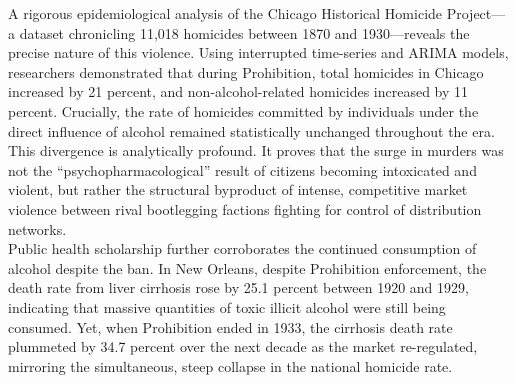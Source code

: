 \documentclass[
]{article}
\begin{document}
A rigorous epidemiological analysis of the Chicago Historical Homicide
Project---a dataset chronicling 11,018 homicides between 1870 and
1930---reveals the precise nature of this violence. Using interrupted
time-series and ARIMA models, researchers demonstrated that during
Prohibition, total homicides in Chicago increased by 21 percent, and
non-alcohol-related homicides increased by 11 percent. Crucially, the
rate of homicides committed by individuals under the direct influence of
alcohol remained statistically unchanged throughout the era.\\
This divergence is analytically profound. It proves that the surge in
murders was not the ``psychopharmacological'' result of citizens
becoming intoxicated and violent, but rather the structural byproduct of
intense, competitive market violence between rival bootlegging factions
fighting for control of distribution networks.\\
Public health scholarship further corroborates the continued consumption
of alcohol despite the ban. In New Orleans, despite Prohibition
enforcement, the death rate from liver cirrhosis rose by 25.1 percent
between 1920 and 1929, indicating that massive quantities of toxic
illicit alcohol were still being consumed. Yet, when Prohibition ended
in 1933, the cirrhosis death rate plummeted by 34.7 percent over the
next decade as the market re-regulated, mirroring the simultaneous,
steep collapse in the national homicide rate.
\end{document}

